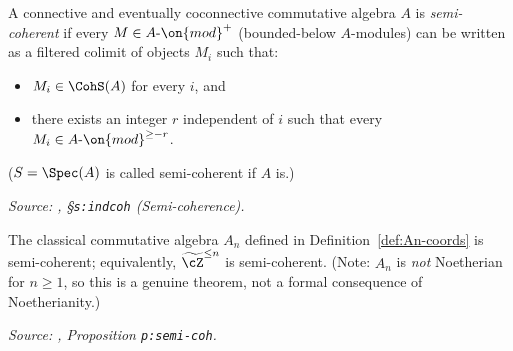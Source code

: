 \begin{definition}
  \label{def:semi-coherent}
  A connective and eventually coconnective commutative algebra $A$ is
  \emph{semi-coherent} if every $M \in A\mbox{-}\on{mod}^+$ (bounded-below
  $A$-modules) can be written as a filtered colimit of objects $M_i$ such that:
  \begin{itemize}
    \item $M_i \in \CohS(A)$ for every $i$, and
    \item there exists an integer $r$ independent of $i$ such that every
          $M_i \in A\mbox{-}\on{mod}^{\geq -r}$.
  \end{itemize}
  ($S = \Spec(A)$ is called semi-coherent if $A$ is.)

  \textit{Source: \cite{hilburn-raskin}, \S\texttt{s:indcoh} (Semi-coherence).}
\end{definition}

\begin{proposition}
  \label{prop:An-semi-coherent}
  The classical commutative algebra $A_n$ defined in
  Definition~\ref{def:An-coords} is semi-coherent; equivalently,
  $\widetilde{\cZ}^{\leq n}$ is semi-coherent. (Note: $A_n$ is
  \emph{not} Noetherian for $n \geq 1$, so this is a genuine theorem,
  not a formal consequence of Noetherianity.)

  \textit{Source: \cite{hilburn-raskin}, Proposition \texttt{p:semi-coh}.}
\end{proposition}

